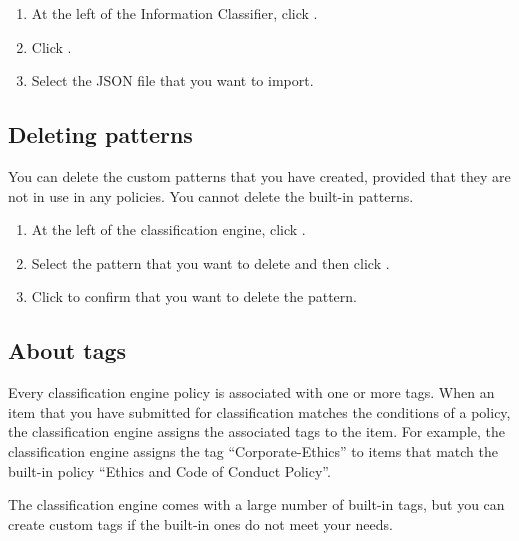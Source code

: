 \documentclass[letterpaper,10pt,english]{sphinxmanual}
\begin{document}
\begin{enumerate}
\item {} 
At the left of the Information Classifier, click .

\item {} 
Click .

\item {} 
Select the JSON file that you want to import.

\end{enumerate}


\subsection{Deleting patterns}
\label{\detokenize{mcdmp_app_ug:deleting-patterns}}
You can delete the custom patterns that you have created, provided that they are not in use in any policies. You cannot delete the built-in patterns.

\begin{enumerate}
\item {} 
At the left of the classification engine, click .

\item {} 
Select the pattern that you want to delete and then click .

\item {} 
Click  to confirm that you want to delete the pattern.

\end{enumerate}


\subsection{About tags}
\label{\detokenize{mcdmp_app_ug:about-tags}}
Every classification engine policy is associated with one or more tags. When an item that you have submitted for classification matches the conditions of a policy, the classification engine assigns the associated tags to the item. For example, the classification engine assigns the tag “Corporate-Ethics” to items that match the built-in policy “Ethics and Code of Conduct Policy”.

The classification engine comes with a large number of built-in tags, but you can create custom tags if the built-in ones do not meet your needs.
\end{document}
